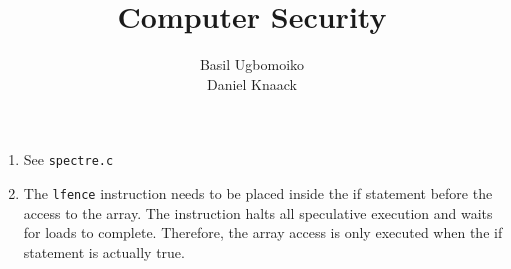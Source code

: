\documentclass[sheet=2, english]{dexercise}
\title{Computer Security}
\author{Basil Ugbomoiko\\Daniel Knaack}
\begin{document}
\task[Spectre]

\begin{enumerate}
  \item See \texttt{spectre.c}
  \item The \texttt{lfence} instruction needs to be placed inside the if
    statement before the access to the array.
    The instruction halts all speculative execution and waits for loads to complete.
    Therefore, the array access is only executed when the if statement is actually true.
\end{enumerate}
\end{document}
